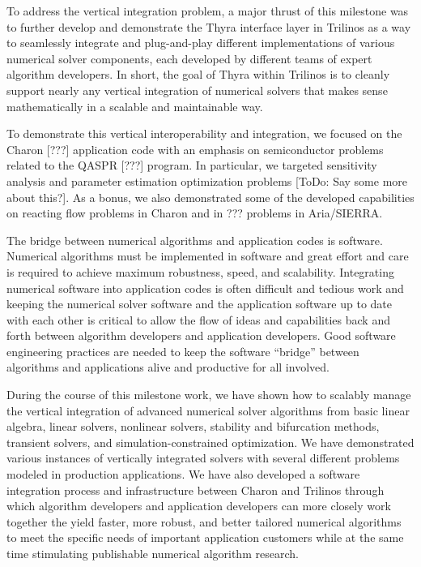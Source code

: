 \documentclass[pdf,ps2pdf,11pt]{SANDreport}
\begin{document}
To address the vertical integration problem, a major thrust of this milestone
was to further develop and demonstrate the Thyra interface layer in Trilinos
as a way to seamlessly integrate and plug-and-play different implementations of
various numerical solver components, each developed by different teams of
expert algorithm developers.  In short, the goal of Thyra within Trilinos is
to cleanly support nearly any vertical integration of numerical solvers that
makes sense mathematically in a scalable and maintainable way.

To demonstrate this vertical interoperability and integration, we focused on
the Charon [???] application code with an emphasis on semiconductor problems
related to the QASPR [???] program.  In particular, we targeted sensitivity
analysis and parameter estimation optimization problems [ToDo: Say some more
about this?].  As a bonus, we also demonstrated some of the developed
capabilities on reacting flow problems in Charon and in ??? problems in
Aria/SIERRA.

The bridge between numerical algorithms and application codes is software.
Numerical algorithms must be implemented in software and great effort and care
is required to achieve maximum robustness, speed, and scalability.
Integrating numerical software into application codes is often difficult and
tedious work and keeping the numerical solver software and the application
software up to date with each other is critical to allow the flow of ideas and
capabilities back and forth between algorithm developers and application
developers.  Good software engineering practices are needed to keep the
software ``bridge'' between algorithms and applications alive and productive
for all involved.

During the course of this milestone work, we have shown how to scalably manage
the vertical integration of advanced numerical solver algorithms from basic
linear algebra, linear solvers, nonlinear solvers, stability and bifurcation
methods, transient solvers, and simulation-constrained optimization.  We have
demonstrated various instances of vertically integrated solvers with several
different problems modeled in production applications.  We have also developed
a software integration process and infrastructure between Charon and Trilinos
through which algorithm developers and application developers can more closely
work together the yield faster, more robust, and better tailored numerical
algorithms to meet the specific needs of important application customers while
at the same time stimulating publishable numerical algorithm research.
\end{document}
